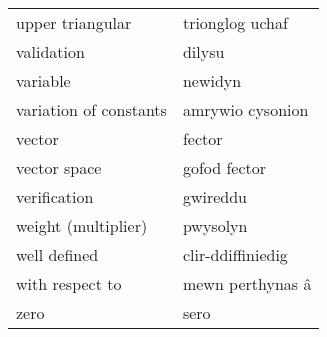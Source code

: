 \begin{supertabular}{p{0.22\textwidth}p{0.22\textwidth}}
upper triangular & trionglog uchaf \\
validation & dilysu \\
variable & newidyn \\
variation of constants & amrywio cysonion \\
vector & fector \\
vector space & gofod fector \\
verification & gwireddu \\
weight (multiplier) & pwysolyn \\
well defined & clir-ddiffiniedig \\
with respect to & mewn perthynas â \\
zero & sero \\
\end{supertabular}
